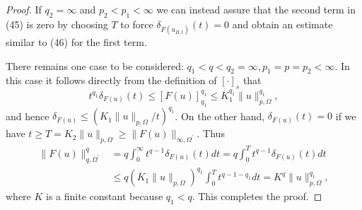 \begin{proof}
  If $q_2=\infty$ and $p_2<p_1<\infty$ we can instead assure that the second term in (45) is zero by choosing $T$ to force $\delta_{F\left(u_{B, t}\right)}(t)=0$ and obtain an estimate similar to (46) for the first term.
  
  There remains one case to be considered: $q_1<q<q_2=\infty, p_1=p=p_2<\infty$. In this case it follows directly from the definition of $[\cdot]_s$ that
  \[
  t^{q_1} \delta_{F(u)}(t) \leq[F(u)]_{q_1}^{q_1} \leq K_1^{q_1}\|u\|_{p, \Omega}^{q_1},
  \]
  and hence $\delta_{F(u)} \leq\left(K_1\|u\|_{p, \Omega} / t\right)^{q_1}$. On the other hand, $\delta_{F(u)}(t)=0$ if we have $t \geq T=K_2\|u\|_{p, \Omega} \geq\|F(u)\|_{\infty, \Omega^{\prime}}$. Thus
  \[
  \begin{aligned}
  \|F(u)\|_{q, \Omega^{\prime}}^q & =q \int_0^{\infty} t^{q-1} \delta_{F(u)}(t) d t=q \int_0^T t^{q-1} \delta_{F(u)}(t) d t \\
  & \leq q\left(K_1\|u\|_{p, \Omega}\right)^{q_1} \int_0^T t^{q-1-q_1} d t=K^q\|u\|_{p, \Omega}^{q_1},
  \end{aligned}
  \]
  where $K$ is a finite constant because $q_1<q$. This completes the proof.
\end{proof}